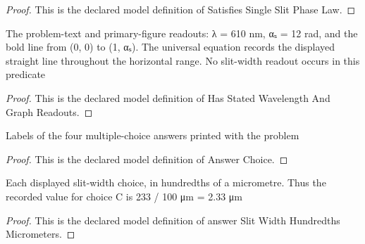 \begin{proof}
  This is the declared model definition of Satisfies Single Slit Phase Law.
\end{proof}
\begin{definition}
  \label{def:physics:phyx-mini-0083:phyxminiproblems-problemphyxmini0083-hasstatedwavelengthandgraphreadouts}
  The problem-text and primary-figure readouts: λ = 610 nm, αₛ = 12 rad, and the bold line from (0, 0) to (1, αₛ). The universal equation records the displayed straight line throughout the horizontal range. No slit-width readout occurs in this predicate
\end{definition}
\begin{proof}
  This is the declared model definition of Has Stated Wavelength And Graph Readouts.
\end{proof}
\begin{definition}
  \label{def:physics:phyx-mini-0083:phyxminiproblems-problemphyxmini0083-answerchoice}
  Labels of the four multiple-choice answers printed with the problem
\end{definition}
\begin{proof}
  This is the declared model definition of Answer Choice.
\end{proof}
\begin{definition}
  \label{def:physics:phyx-mini-0083:phyxminiproblems-problemphyxmini0083-answerslitwidthhundredthsmicrometers}
  Each displayed slit-width choice, in hundredths of a micrometre. Thus the recorded value for choice C is 233 / 100 μm = 2.33 μm
\end{definition}
\begin{proof}
  This is the declared model definition of answer Slit Width Hundredths Micrometers.
\end{proof}
